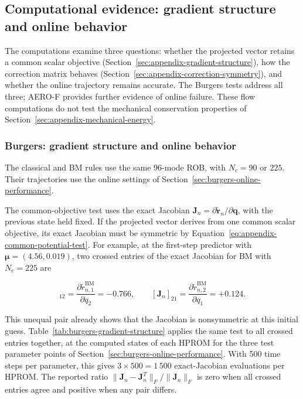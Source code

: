 \documentclass[a4paper,12pt]{article}
\newcommand{\vect}[1]{\boldsymbol{#1}}
\newcommand{\matr}[1]{\boldsymbol{#1}}
\begin{document}
\subsection{Computational evidence: gradient structure and online behavior}
\label{sec:appendix-symmetric-part}

The computations examine three questions: whether the projected vector retains a common scalar objective (Section~\ref{sec:appendix-gradient-structure}), how the correction matrix behaves (Section~\ref{sec:appendix-correction-symmetry}), and whether the online trajectory remains accurate. The Burgers tests address all three; AERO-F provides further evidence of online failure. These flow computations do not test the mechanical conservation properties of Section~\ref{sec:appendix-mechanical-energy}.

\subsubsection{Burgers: gradient structure and online behavior}
\label{sec:appendix-symmetric-part-burgers}

The classical and BM rules use the same 96-mode ROB, with $N_c=90$ or $225$. Their trajectories use the online settings of Section~\ref{sec:burgers-online-performance}.

The common-objective test uses the exact Jacobian $\matr{J}_n=\partial\widetilde{\vect{r}}_n/\partial\vect{q}$, with the previous state held fixed. If the projected vector derives from one common scalar objective, its exact Jacobian must be symmetric by Equation~\eqref{eq:appendix-common-potential-test}. For example, at the first-step predictor with $\vect{\mu}=(4.56,0.019)$, two crossed entries of the exact Jacobian for BM with $N_c=225$ are

\begin{equation}
 [\matr{J}_n]_{12}
 =\frac{\partial\widetilde r_{n,1}^{\mathrm{BM}}}{\partial q_2}
 = -0.766,
 \qquad
 [\matr{J}_n]_{21}
 =\frac{\partial\widetilde r_{n,2}^{\mathrm{BM}}}{\partial q_1}
 = +0.124.
 \label{eq:burgers-exact-crossed-derivatives}
\end{equation}

This unequal pair already shows that the Jacobian is nonsymmetric at this initial guess. Table~\ref{tab:burgers-gradient-structure} applies the same test to all crossed entries together, at the computed states of each HPROM for the three test parameter points of Section~\ref{sec:burgers-online-performance}. With 500 time steps per parameter, this gives $3\times500=1\,500$ exact-Jacobian evaluations per HPROM. The reported ratio $\|\matr{J}_n-\matr{J}_n^T\|_F/\|\matr{J}_n\|_F$ is zero when all crossed entries agree and positive when any pair differs.
\end{document}

